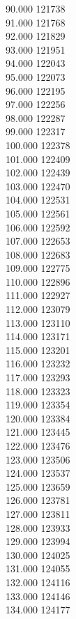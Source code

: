 { 90.000	121738 \\
 91.000	121768 \\
 92.000	121829 \\
 93.000	121951 \\
 94.000	122043 \\
 95.000	122073 \\
 96.000	122195 \\
 97.000	122256 \\
 98.000	122287 \\
 99.000	122317 \\
 100.000	122378 \\
 101.000	122409 \\
 102.000	122439 \\
 103.000	122470 \\
 104.000	122531 \\
 105.000	122561 \\
 106.000	122592 \\
 107.000	122653 \\
 108.000	122683 \\
 109.000	122775 \\
 110.000	122896 \\
 111.000	122927 \\
 112.000	123079 \\
 113.000	123110 \\
 114.000	123171 \\
 115.000	123201 \\
 116.000	123232 \\
 117.000	123293 \\
 118.000	123323 \\
 119.000	123354 \\
 120.000	123384 \\
 121.000	123445 \\
 122.000	123476 \\
 123.000	123506 \\
 124.000	123537 \\
 125.000	123659 \\
 126.000	123781 \\
 127.000	123811 \\
 128.000	123933 \\
 129.000	123994 \\
 130.000	124025 \\
 131.000	124055 \\
 132.000	124116 \\
 133.000	124146 \\
 134.000	124177 \\
}
